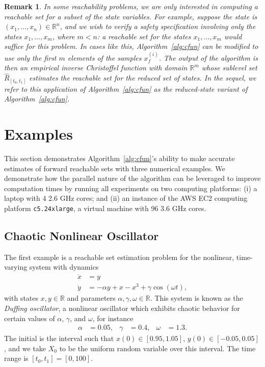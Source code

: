 \documentclass[letterpaper, 10 pt, conference]{ieeeconf}
\newcommand{\R}{\mathbb{R}}
\newcommand{\ars}{\ensuremath{\hat{R}_{[t_0,t_1]}}}
\newtheorem{remark}{Remark}
\begin{document}
\begin{remark}
    \label{rmk:rs_subset}
    In some reachability problems, we are only interested in computing a
    reachable set for a subset of the state variables.
    For example, suppose the state is $(x_1,\dotsc,x_n)\in\R^n$, and we wish to
    verify a safety specification involving only the states $x_1,\dotsc,x_m$,
    where $m<n$: a reachable set for the states $x_1,\dotsc,x_m$ would suffice
    for this problem.
    In cases like this, Algorithm~\ref{alg:cfun} can be modified to use only the first
    $m$ elements of the samples $x_f^{(i)}$. The output of the algorithm is then
    an empirical inverse Christoffel function with domain $\R^m$ whose sublevel
    set $\ars$ estimates the reachable set for the reduced set of states.
    In the sequel, we refer to this application of Algorithm~\ref{alg:cfun} as the \emph{reduced-state variant} of Algorithm~\ref{alg:cfun}.
\end{remark}

\section{Examples}
\label{sec:numerical_examples}

This section demonstrates Algorithm~\ref{alg:cfun}'s ability to make
accurate estimates of forward reachable sets with three numerical examples. 
We demonstrate how the parallel nature of the algorithm can be leveraged to improve computation times by running all experiments on two computing platforms: (i) a laptop with 4 2.6 GHz cores; and (ii) an instance of the AWS EC2 computing platform \texttt{c5.24xlarge}, a virtual machine with 96 3.6 GHz cores. 

\subsection{Chaotic Nonlinear Oscillator}
\label{subsec:chaotic_nonlinear_oscillator}

The first example is a reachable set estimation problem for the nonlinear,
time-varying
system with dynamics
\begin{equation}
    \label{eq:duffing_dynamics}
    \begin{split}
        \dot{x} &= y \\
        \dot{y} &= -\alpha y + x - x^3 + \gamma\cos(\omega t),
    \end{split}
\end{equation}
with states $x,y\in\R$ and parameters $\alpha, \gamma, \omega\in\R$. This system
is known as the \emph{Duffing oscillator}, a nonlinear oscillator which exhibits
chaotic behavior for certain values of $\alpha$, $\gamma$, and $\omega$, for instance
\begin{equation}
    \begin{aligned}
        \alpha &= 0.05, & \gamma &= 0.4, & \omega &= 1.3.
    \end{aligned}
\end{equation}
The initial is the interval such that $x(0)\in[0.95, 1.05]$,
$y(0)\in[-0.05,0.05]$, and we take $X_0$ to be the uniform random variable over this interval. The time range is $[t_0,t_1]=[0,100]$.
\end{document}
